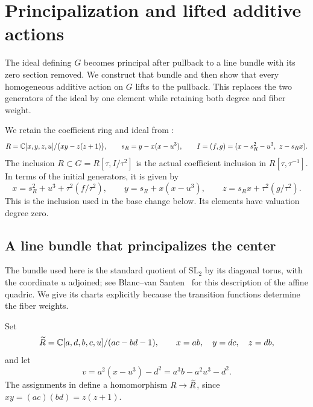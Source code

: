 \section{Principalization and lifted additive actions}
\label{sec:bundle}

The ideal defining $G$ becomes principal after pullback to a line
bundle with its zero section removed. We construct that bundle and then
show that every homogeneous additive action on $G$ lifts to the
pullback. This replaces the two generators of the ideal by one element
while retaining both degree and fiber weight.

We retain the coefficient ring and ideal from :
\[
 R=\mathbb C[x,y,z,u]/\bigl(xy-z(z+1)\bigr),\qquad
 s_R=y-x(x-u^3),\qquad
 I=(f,g)=(x-s_R^2-u^3,\ z-s_Rx).
\]
The inclusion $R\subset G=R[\tau,I/\tau^2]$ is the actual coefficient
inclusion in $R[\tau,\tau^{-1}]$. In terms of the initial generators,
it is given by
\begin{equation}
\label{bun:coefficient-inclusion}
 x=s_R^2+u^3+\tau^2(f/\tau^2),\qquad
 y=s_R+x(x-u^3),\qquad
 z=s_Rx+\tau^2(g/\tau^2).
\end{equation}
This is the inclusion used in the base change below. Its elements have
valuation degree zero.

\subsection{A line bundle that principalizes the center}

The bundle used here is the standard quotient of $\mathrm{SL}_2$ by
its diagonal torus, with the coordinate $u$ adjoined; see
Blanc--van Santen~\cite[p.~8431]{BlancVanSanten} for this
description of the affine quadric. We give its charts explicitly
because the transition functions determine the fiber weights.

Set
\begin{equation}
\label{bun:determinant-ring}
 \widetilde R=\mathbb C[a,d,b,c,u]/(ac-bd-1),\qquad
 x=ab,\quad y=dc,\quad z=db,
\end{equation}
and let
\begin{equation}
\label{bun:v}
 v=a^2(x-u^3)-d^2=a^3b-a^2u^3-d^2.
\end{equation}
The assignments in  define a homomorphism
$R\to\widetilde R$, since $xy=(ac)(bd)=z(z+1)$.

